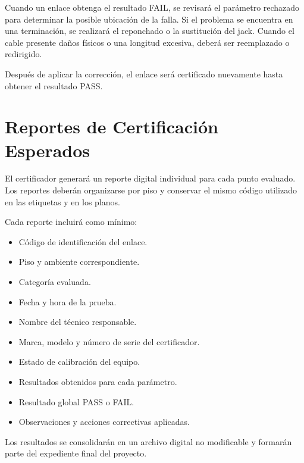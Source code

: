 Cuando un enlace obtenga el resultado FAIL, se revisará el parámetro rechazado para determinar la posible ubicación de la falla. Si el problema se encuentra en una terminación, se realizará el reponchado o la sustitución del jack. Cuando el cable presente daños físicos o una longitud excesiva, deberá ser reemplazado o redirigido.

Después de aplicar la corrección, el enlace será certificado nuevamente hasta obtener el resultado PASS.

\section{Reportes de Certificación Esperados}

El certificador generará un reporte digital individual para cada punto evaluado. Los reportes deberán organizarse por piso y conservar el mismo código utilizado en las etiquetas y en los planos.

Cada reporte incluirá como mínimo:

\begin{itemize}
    \item Código de identificación del enlace.
    \item Piso y ambiente correspondiente.
    \item Categoría evaluada.
    \item Fecha y hora de la prueba.
    \item Nombre del técnico responsable.
    \item Marca, modelo y número de serie del certificador.
    \item Estado de calibración del equipo.
    \item Resultados obtenidos para cada parámetro.
    \item Resultado global PASS o FAIL.
    \item Observaciones y acciones correctivas aplicadas.
\end{itemize}

Los resultados se consolidarán en un archivo digital no modificable y formarán parte del expediente final del proyecto.

\begin{table}[H]
\centering
\caption{Formato resumido para el control de certificación.}
\label{tab:control_certificacion}
\end{table}

